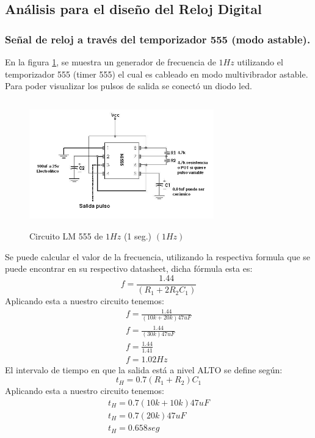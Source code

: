 \documentclass[journal]{IEEEtran}
\begin{document}
\subsection{Análisis para el diseño del Reloj Digital}
\subsubsection{Señal de reloj a través del temporizador 555 (modo astable).}
En la figura \ref{circuit_diagram}, se muestra un generador de frecuencia de $1Hz$ utilizando el temporizador 555 (timer 555) el cual es cableado en modo multivibrador astable. Para poder visualizar los pulsos de salida se conectó un diodo led.

\begin{figure}[htb]
    \centering
    \includegraphics[width=8cm, height=5.5cm]{images/image1.png}
    \caption{Circuito LM 555 de $1Hz$ (1 seg.) $\left ( 1Hz \right )$}
    \label{circuit_diagram}
\end{figure}
Se puede calcular el valor de la frecuencia, utilizando la respectiva formula que se puede encontrar en su respectivo datasheet, dicha fórmula esta es:
\[
    f=\frac{1.44}{\left ( R_{1}+2R_{2}C_{1} \right )}  
\]
Aplicando esta a nuestro circuito tenemos:
\[\begin{array}{crl}
    f=\frac{1.44}{\left ( 10k+20k \right ) 47uF}
    \\
    f=\frac{1.44}{\left ( 30k \right ) 47uF}
    \\
    f=\frac{1.44}{1.41}
    \\
    f=1.02Hz   
\end{array}\]
El intervalo de tiempo en que la salida está a nivel ALTO se define según:
\[
    t_{H}=0.7\left ( R_{1}+R_{2} \right )C_{1}
\]
Aplicando esta a nuestro circuito tenemos:
\[\begin{array}{crl}
    t_{H}=0.7\left (10k+10k \right )47uF
    \\
    t_{H}=0.7\left ( 20k \right )47uF
    \\
    t_{H}=0.658 seg
\end{array}\]
\end{document}
